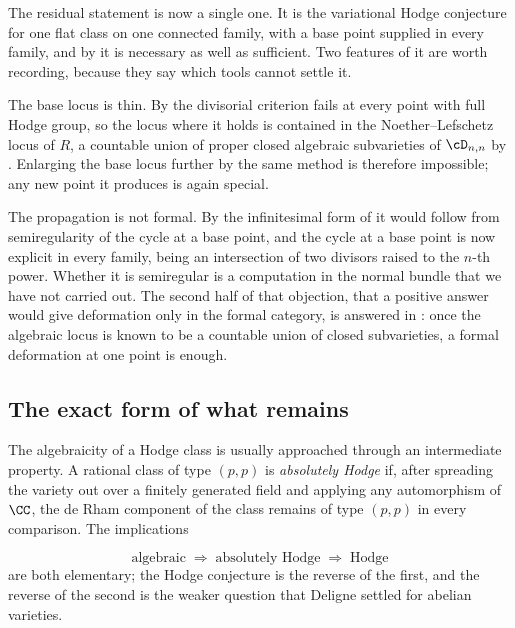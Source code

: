 \begin{remark}\label{rem:whatsleftnow}
The residual statement is now a single one. It is the variational Hodge
conjecture for one flat class on one connected family, with a base point
supplied in every family, and by  it is necessary as well
as sufficient. Two features of it are worth recording, because they say which
tools cannot settle it.

The base locus is thin. By  the divisorial criterion fails
at every point with full Hodge group, so the locus where it holds is contained
in the Noether--Lefschetz locus of $R$, a countable union of proper closed
algebraic subvarieties of $\cD_{n,n}$ by . Enlarging the base
locus further by the same method is therefore impossible; any new point it
produces is again special.

The propagation is not formal. By  the infinitesimal
form of it would follow from semiregularity of the cycle at a base point, and
the cycle at a base point is now explicit in every family, being an
intersection of two divisors raised to the $n$-th power. Whether it is
semiregular is a computation in the normal bundle that we have not carried
out. The second half of that objection, that a positive answer would give
deformation only in the formal category, is answered in
: once the algebraic locus is known to be a countable
union of closed subvarieties, a formal deformation at one point is enough.
\end{remark}

\subsection{The exact form of what remains}\label{ssec:exactform}

The algebraicity of a Hodge class is usually approached through an
intermediate property. A rational class of type $(p,p)$ is \emph{absolutely
Hodge} if, after spreading the variety out over a finitely generated field and
applying any automorphism of $\CC$, the de Rham component of the class remains
of type $(p,p)$ in every comparison. The implications

\begin{equation}\label{eq:threechain}
  \text{algebraic}
  \;\Longrightarrow\;
  \text{absolutely Hodge}
  \;\Longrightarrow\;
  \text{Hodge}
\end{equation}
are both elementary; the Hodge conjecture is the reverse of the first, and the
reverse of the second is the weaker question that Deligne settled for abelian
varieties.

